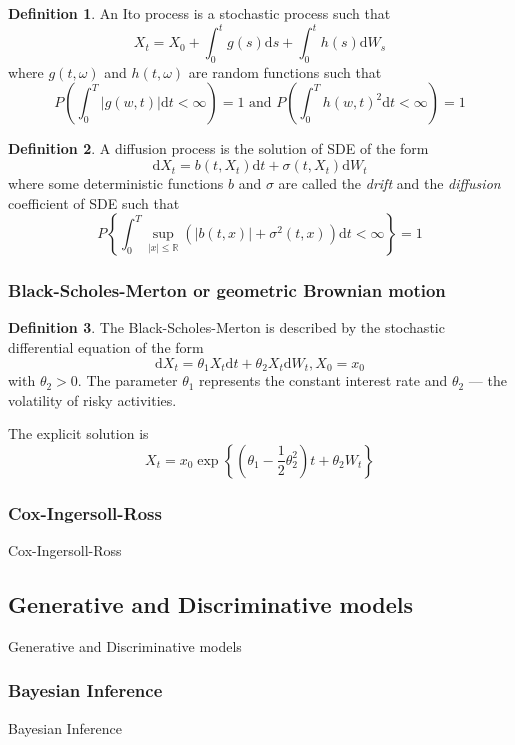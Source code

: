 \documentclass{article}
\theoremstyle{definition}
\newtheorem{definition}{Definition}[section]
\begin{document}
\begin{definition}
    An Ito process is a stochastic process such that
    $$X_t = X_0 + \int_0^t g(s) \mathrm ds + \int_0^t h(s) \mathrm dW_s$$
    where $g(t, \omega)$ and $h(t, \omega)$ are random functions such that
    $$P \left( \int_0^T |g(w, t)| \mathrm dt  < \infty\right) = 1 \text{ and } P \left( \int_0^T h(w, t)^2 \mathrm dt  < \infty\right) = 1$$
\end{definition}

\begin{definition}
    A diffusion process is the solution of SDE of the form
    $$\mathrm d X_t = b(t, X_t) \mathrm  d t + \sigma(t, X_t) \mathrm d W_t$$
    where some deterministic functions $b$ and $\sigma$ are called the \emph{drift} and the \emph{diffusion} coefficient of SDE such that
    $$P\left\{\int_0^T \sup_{|x|\leq \mathbb R}(|b(t, x)| + \sigma^2(t, x))\mathrm dt < \infty\right\} = 1$$
\end{definition}

\subsubsection{Black-Scholes-Merton or geometric Brownian motion}

\begin{definition}
    The  Black-Scholes-Merton is described by the stochastic differential equation of the form
    $$\mathrm d X_t = \theta_1 X_t \mathrm d t + \theta_2 X_t \mathrm d W_t, X_0=x_0$$
    with $\theta_2 > 0$. The parameter $\theta_1$ represents the constant interest rate and $\theta_2$ --- the volatility of risky activities.
\end{definition}

The explicit solution is $$X_t = x_0 \exp\left\{ \left(\theta_1 - \frac{1}{2}\theta_2^2 \right) t + \theta_2 W_t \right\}$$

\subsubsection{Cox-Ingersoll-Ross}
Cox-Ingersoll-Ross

\subsection{Generative and Discriminative models}
Generative and Discriminative models

\subsubsection{Bayesian Inference}
Bayesian Inference
\end{document}
